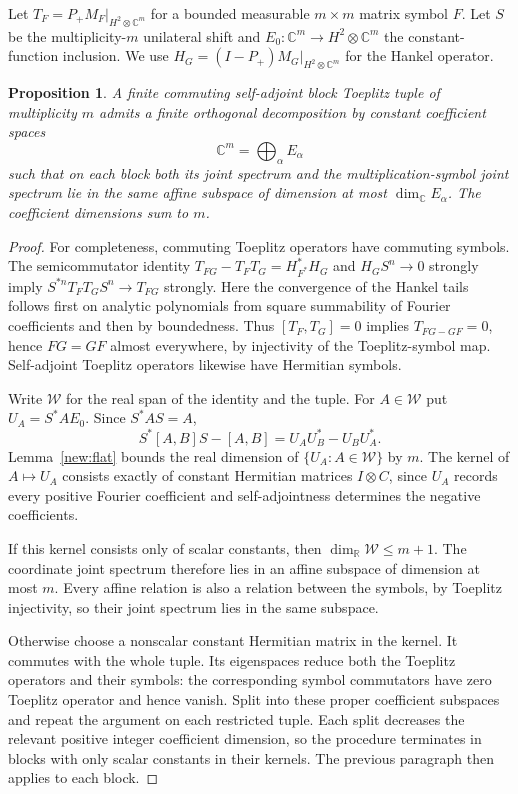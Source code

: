\documentclass[11pt,letterpaper]{amsart}
\newtheorem{proposition}[theorem]{Proposition}
\theoremstyle{definition}
\theoremstyle{remark}
\numberwithin{equation}{section}
\newcommand{\R}{\mathbb R}
\newcommand{\C}{\mathbb C}
\begin{document}
Let $T_F=P_+M_F|_{H^2\otimes\C^m}$ for a bounded measurable
$m\times m$ matrix symbol $F$. Let $S$ be the multiplicity-$m$ unilateral
shift and $E_0:\C^m\to H^2\otimes\C^m$ the constant-function inclusion. We use
$H_G=(I-P_+)M_G|_{H^2\otimes\C^m}$ for the Hankel operator.

\begin{proposition}\label{new:block}
A finite commuting self-adjoint block Toeplitz tuple of multiplicity $m$
admits a finite orthogonal decomposition by constant coefficient spaces
\[
                         \C^m=\bigoplus_\alpha E_\alpha
\]
such that on each block both its joint spectrum and the
multiplication-symbol joint spectrum lie in the same affine subspace of
dimension at most $\dim_\C E_\alpha$. The coefficient dimensions sum
to $m$.
\end{proposition}
\begin{proof}
For completeness, commuting Toeplitz operators have commuting symbols.
The semicommutator identity
$T_{FG}-T_FT_G=H_{F^*}^*H_G$ and
$H_GS^n\to0$ strongly imply
$S^{*n}T_FT_GS^n\to T_{FG}$ strongly. Here the convergence of the
Hankel tails follows first on analytic polynomials from square summability
of Fourier coefficients and then by boundedness. Thus
$[T_F,T_G]=0$ implies $T_{FG-GF}=0$, hence $FG=GF$ almost everywhere,
by injectivity of the Toeplitz-symbol map. Self-adjoint Toeplitz operators
likewise have Hermitian symbols.

Write $\mathcal W$ for the real span of the identity and the tuple.
For $A\in\mathcal W$ put $U_A=S^*AE_0$. Since $S^*AS=A$,
\[
 S^*[A,B]S-[A,B]=U_AU_B^*-U_BU_A^*.
\]
Lemma~\ref{new:flat} bounds the real dimension of
$\{U_A:A\in\mathcal W\}$ by $m$. The kernel of $A\mapsto U_A$
consists exactly of constant Hermitian matrices $I\otimes C$, since
$U_A$ records every positive Fourier coefficient and self-adjointness
determines the negative coefficients.

If this kernel consists only of scalar constants, then
$\dim_\R\mathcal W\le m+1$. The coordinate joint spectrum therefore
lies in an affine subspace of dimension at most $m$. Every affine
relation is also a relation between the symbols, by Toeplitz
injectivity, so their joint spectrum lies in the same subspace.

Otherwise choose a nonscalar constant Hermitian matrix in the kernel.
It commutes with the whole tuple. Its eigenspaces reduce both the
Toeplitz operators and their symbols: the corresponding symbol
commutators have zero Toeplitz operator and hence vanish. Split into
these proper coefficient subspaces and repeat the argument on each
restricted tuple. Each split decreases the relevant positive integer
coefficient dimension, so the procedure terminates in blocks with
only scalar constants in their kernels. The previous paragraph then
applies to each block.
\end{proof}
\end{document}
